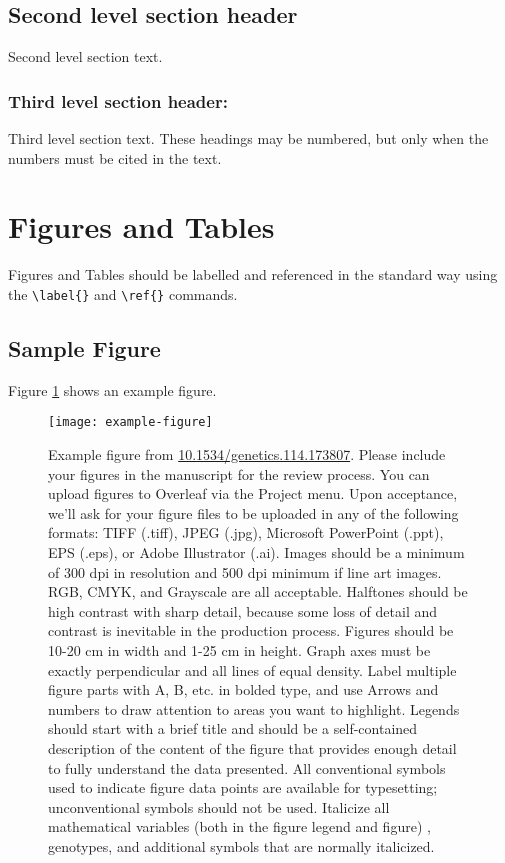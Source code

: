 \documentclass[9pt,twocolumn,twoside]{gsajnl}
\begin{document}
\subsection*{Second level section header}

Second level section text.

\subsubsection*{Third level section header:}

Third level section text. These headings may be numbered, but only when the numbers must be cited in the text. 

\section*{Figures and Tables}

Figures and Tables should be labelled and referenced in the standard way using the \verb|\label{}| and \verb|\ref{}| commands.

\subsection*{Sample Figure}

Figure \ref{fig:spectrum} shows an example figure.

\begin{figure}[htbp]
\centering
\texttt{[image: example-figure]}
\caption{Example figure from \url{10.1534/genetics.114.173807}. Please include your figures in the manuscript for the review process. You can upload figures to Overleaf via the Project menu. Upon acceptance, we'll ask for your figure files to be uploaded in any of the following formats: TIFF (.tiff), JPEG (.jpg), Microsoft PowerPoint (.ppt), EPS (.eps), or Adobe Illustrator (.ai).  Images should be a minimum of 300 dpi in resolution and 500 dpi minimum if line art images.  RGB, CMYK, and Grayscale are all acceptable. Halftones should be high contrast with sharp detail, because some loss of detail and contrast is inevitable in the production process. Figures should be 10-20 cm in width and 1-25 cm in height. Graph axes must be exactly perpendicular and all lines of equal density.
Label multiple figure parts with A, B, etc. in bolded type, and use Arrows and numbers to draw attention to areas you want to highlight. Legends should start with a brief title and should be a self-contained description of the content of the figure that provides enough detail to fully understand the data presented. All conventional symbols used to indicate figure data points are available for typesetting; unconventional symbols should not be used. Italicize all mathematical variables (both in the figure legend and figure) , genotypes, and additional symbols that are normally italicized.  
}%
\label{fig:spectrum}
\end{figure}
\end{document}
